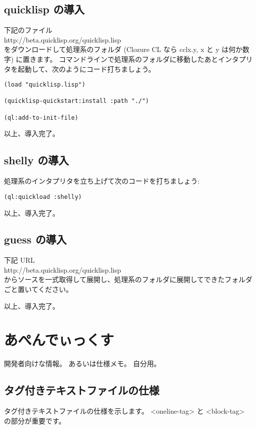 \documentclass[a4j]{jsarticle}
\begin{document}
\subsection{quicklisp の導入}

下記のファイル \\
http://beta.quicklisp.org/quicklisp.lisp \\
をダウンロードして処理系のフォルダ (Clozure CL なら cclx.y, x と y は何か数字) に置きます。
コマンドラインで処理系のフォルダに移動したあとインタプリタを起動して、次のようにコード打ちましょう。

\begin{lstlisting}
(load "quicklisp.lisp")

(quicklisp-quickstart:install :path "./")

(ql:add-to-init-file)
\end{lstlisting}

以上、導入完了。


\subsection{shelly の導入}
処理系のインタプリタを立ち上げて次のコードを打ちましょう:

\begin{lstlisting}
(ql:quickload :shelly)
\end{lstlisting}

以上、導入完了。


\subsection{guess の導入}
下記 URL \\
http://beta.quicklisp.org/quicklisp.lisp \\
からソースを一式取得して展開し、処理系のフォルダに展開してできたフォルダごと置いてください。

以上、導入完了。


\section{あぺんでぃっくす}
開発者向けな情報。
あるいは仕様メモ。
自分用。


\subsection{タグ付きテキストファイルの仕様}

タグ付きテキストファイルの仕様を示します。
<oneline-tag> と <block-tag> の部分が重要です。
\end{document}
